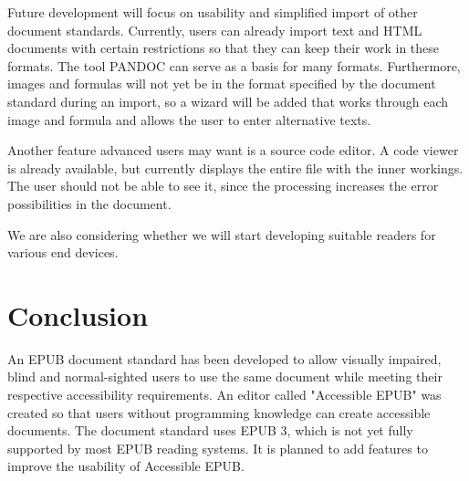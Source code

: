 \documentclass[runningheads,a4paper]{llncs}
\begin{document}
Future development will focus on usability and simplified import of other document standards. Currently, users can already import text and HTML documents with certain restrictions so that they can keep their work in these formats. The tool PANDOC can serve as a basis for many formats.
Furthermore, images and formulas will not yet be in the format specified by the document standard during an import, so a wizard will be added that works through each image and formula and allows the user to enter alternative texts.  

Another feature advanced users may want is a source code editor. A code viewer is already available, but currently displays the entire file with the inner workings. The user should not be able to see it, since the processing increases the error possibilities in the document.

We are also considering whether we will start developing suitable readers for various end devices.

\section{Conclusion}
An EPUB document standard has been developed to allow visually impaired, blind and normal-sighted users to use the same document while meeting their respective accessibility requirements. An editor called "Accessible EPUB" was created so that users without programming knowledge can create accessible documents. The document standard uses EPUB 3, which is not yet fully supported by most EPUB reading systems.
It is planned to add features to improve the usability of Accessible EPUB.




\end{document}
